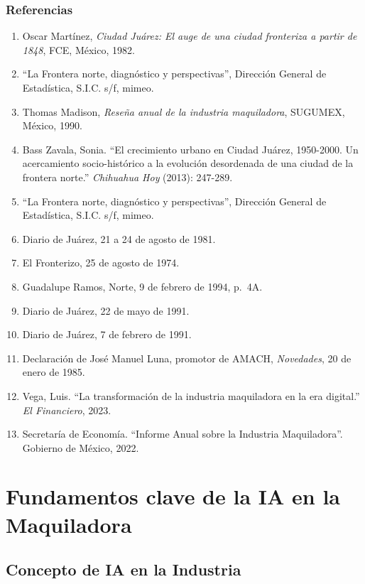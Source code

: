 \documentclass[
  10pt,
  letterpaper,
]{book}
\providecommand{\tightlist}{%
  \setlength{\itemsep}{0pt}\setlength{\parskip}{0pt}}\usepackage{longtable,booktabs,array}
\begin{document}
\subsection{Referencias}\label{referencias}

\begin{enumerate}
\def\labelenumi{\arabic{enumi}.}
\tightlist
\item
  Oscar Martínez, \emph{Ciudad Juárez: El auge de una ciudad fronteriza
  a partir de 1848}, FCE, México, 1982.
\item
  ``La Frontera norte, diagnóstico y perspectivas'', Dirección General
  de Estadística, S.I.C. s/f, mimeo.
\item
  Thomas Madison, \emph{Reseña anual de la industria maquiladora},
  SUGUMEX, México, 1990.
\item
  Bass Zavala, Sonia. ``El crecimiento urbano en Ciudad Juárez,
  1950-2000. Un acercamiento socio-histórico a la evolución desordenada
  de una ciudad de la frontera norte.'' \emph{Chihuahua Hoy} (2013):
  247-289.
\item
  ``La Frontera norte, diagnóstico y perspectivas'', Dirección General
  de Estadística, S.I.C. s/f, mimeo.
\item
  Diario de Juárez, 21 a 24 de agosto de 1981.
\item
  El Fronterizo, 25 de agosto de 1974.
\item
  Guadalupe Ramos, Norte, 9 de febrero de 1994, p.~4A.
\item
  Diario de Juárez, 22 de mayo de 1991.
\item
  Diario de Juárez, 7 de febrero de 1991.
\item
  Declaración de José Manuel Luna, promotor de AMACH, \emph{Novedades},
  20 de enero de 1985.
\item
  Vega, Luis. ``La transformación de la industria maquiladora en la era
  digital.'' \emph{El Financiero}, 2023.
\item
  Secretaría de Economía. ``Informe Anual sobre la Industria
  Maquiladora''. Gobierno de México, 2022.
\end{enumerate}


\chapter{Fundamentos clave de la IA en la
Maquiladora}\label{fundamentos-clave-de-la-ia-en-la-maquiladora}

\section{Concepto de IA en la
Industria}\label{concepto-de-ia-en-la-industria}
\end{document}
